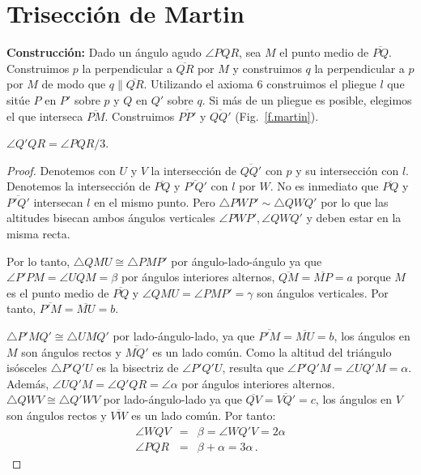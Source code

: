 \section{Trisección de Martin}\label{s.martin-trisection}

\noindent\textbf{Construcción:}
Dado un ángulo agudo $\angle PQR$, sea $M$ el punto medio de $\overline{PQ}$. Construimos $p$ la perpendicular a $\overline{QR}$ por $M$ y construimos $q$ la perpendicular a $p$ por $M$ de modo que $q\parallel\overline{QR}$. Utilizando el axioma 6 construimos el pliegue $l$ que sitúe $P$ en $P'$ sobre $p$ y $Q$ en $Q'$ sobre $q$. Si más de un pliegue es posible, elegimos el que interseca $\overline{PM}$. Construimos $\overline{PP'}$ y $\overline{QQ'}$  (Fig.~\ref{f.martin}).

\begin{theorem}
$\angle Q'QR=\angle PQR/3$.
\end{theorem}
\begin{proof}
Denotemos con $U$ y $V$ la intersección de $\overline{QQ'}$ con $p$ y su intersección con $l$. Denotemos la intersección de $\overline{PQ}$ y $\overline{P'Q'}$ con $l$ por $W$. No es inmediato que $\overline{PQ}$ y $\overline{P'Q'}$ intersecan $l$ en el mismo punto. Pero $\triangle PWP' \sim \triangle QWQ'$ por lo que las altitudes bisecan ambos ángulos verticales $\angle PWP', \angle QWQ'$ y deben estar en la misma recta.

Por lo tanto, $\triangle QMU\cong \triangle PMP'$ por ángulo-lado-ángulo ya que $\angle P'PM=\angle UQM=\beta$ por ángulos interiores alternos, $\overline{QM}=\overline{MP}=a$ porque $M$ es el punto medio de $\overline{PQ}$ y $\angle QMU=\angle PMP'=\gamma$ son ángulos verticales. Por tanto, $\overline{P'M}=\overline{MU}=b$.

$\triangle P'MQ'\cong \triangle UMQ'$ por lado-ángulo-lado, ya que $\overline{P'M}=\overline{MU}=b$, los ángulos en $M$ son ángulos rectos y $\overline{MQ'}$ es un lado común. Como la altitud del triángulo isósceles $\triangle P'Q'U$ es la bisectriz de $\angle P'Q'U$, resulta que $\angle P'Q'M=\angle UQ'M=\alpha$. Además, $\angle UQ'M=\angle Q'QR=\angle \alpha$ por ángulos interiores alternos. $\triangle QWV\cong\triangle Q'WV$ por lado-ángulo-lado ya que $\overline{QV}=\overline{VQ'}=c$, los ángulos en $V$ son ángulos rectos y $\overline{VW}$ es un lado común. Por tanto:
\begin{eqnarray*}
\angle WQV&=&\beta=\angle WQ'V=2\alpha\\
\angle PQR &=& \beta + \alpha = 3\alpha\,.
\end{eqnarray*}
\end{proof}

